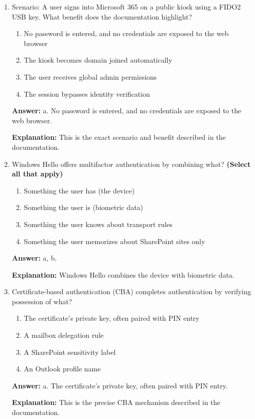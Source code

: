 \documentclass[10pt]{article}
\begin{document}
\begin{enumerate}[leftmargin=*]
\item Scenario: A user signs into Microsoft 365 on a public kiosk using a FIDO2 USB key. What benefit does the documentation highlight?
\begin{enumerate}[label=\alph*., leftmargin=1.5em]
\item No password is entered, and no credentials are exposed to the web browser
\item The kiosk becomes domain joined automatically
\item The user receives global admin permissions
\item The session bypasses identity verification
\end{enumerate}
\textbf{Answer:} a. No password is entered, and no credentials are exposed to the web browser.

\textbf{Explanation:} This is the exact scenario and benefit described in the documentation.

\item Windows Hello offers multifactor authentication by combining what? \textbf{(Select all that apply)}
\begin{enumerate}[label=\alph*., leftmargin=1.5em]
\item Something the user has (the device)
\item Something the user is (biometric data)
\item Something the user knows about transport rules
\item Something the user memorizes about SharePoint sites only
\end{enumerate}
\textbf{Answer:} a, b.

\textbf{Explanation:} Windows Hello combines the device with biometric data.

\item Certificate-based authentication (CBA) completes authentication by verifying possession of what?
\begin{enumerate}[label=\alph*., leftmargin=1.5em]
\item The certificate’s private key, often paired with PIN entry
\item A mailbox delegation rule
\item A SharePoint sensitivity label
\item An Outlook profile name
\end{enumerate}
\textbf{Answer:} a. The certificate’s private key, often paired with PIN entry.

\textbf{Explanation:} This is the precise CBA mechanism described in the documentation.


\end{enumerate}
\end{document}
